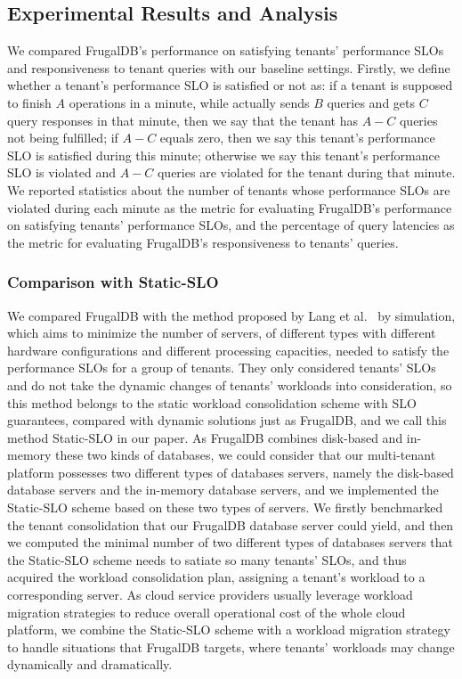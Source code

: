 \subsection{Experimental Results and Analysis}

We compared FrugalDB's performance on satisfying tenants' performance SLOs and responsiveness to tenant queries with our baseline settings. Firstly, we define whether a tenant's performance SLO is satisfied or not as: if a tenant is supposed to finish $A$ operations in a minute, while actually sends $B$ queries and gets $C$ query responses in that minute, then we say that the tenant has $A-C$ queries not being fulfilled; if $A-C$ equals zero, then we say this tenant's performance SLO is satisfied during this minute; otherwise we say this tenant's performance SLO is violated and $A-C$ queries are violated for the tenant during that minute. We reported statistics about the number of tenants whose performance SLOs are violated during each minute as the metric for evaluating FrugalDB's performance on satisfying tenants' performance SLOs, and the percentage of query latencies as the metric for evaluating FrugalDB's responsiveness to tenants' queries.


\subsubsection{Comparison with Static-SLO}

We compared FrugalDB with the method proposed by Lang et al.~\cite{TSLOS} by simulation, which aims to minimize the number of servers, of different types with different hardware configurations and different processing capacities, needed to satisfy the performance SLOs for a group of tenants. They only considered tenants' SLOs and do not take the dynamic changes of tenants' workloads into consideration, so this method belongs to the static workload consolidation scheme with SLO guarantees, compared with dynamic solutions just as FrugalDB, and we call this method Static-SLO in our paper. As FrugalDB combines disk-based and in-memory these two kinds of databases, we could consider that our multi-tenant platform possesses two different types of databases servers, namely the disk-based database servers and the in-memory database servers, and we implemented the Static-SLO scheme based on these two types of servers. We firstly benchmarked the tenant consolidation that our FrugalDB database server could yield, and then we computed the minimal number of two different types of databases servers that the Static-SLO scheme needs to satiate so many tenants' SLOs, and thus acquired the workload consolidation plan, assigning a tenant's workload to a corresponding server. As cloud service providers usually leverage workload migration strategies to reduce overall operational cost of the whole cloud platform, we combine the Static-SLO scheme with a workload migration strategy to handle situations that FrugalDB targets, where tenants' workloads may change dynamically and dramatically.

